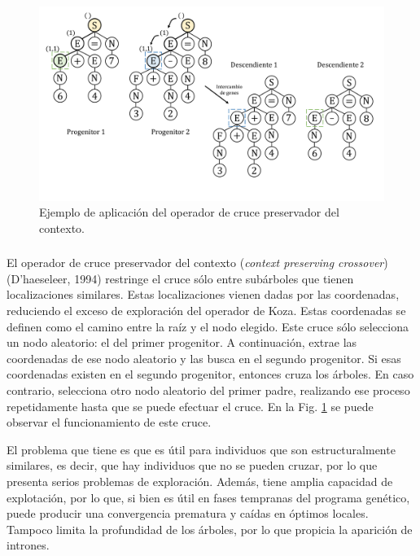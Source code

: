 \documentclass[spanish,a4paper,12pt,twoside]{report}
\begin{document}
        \begin{figure}[H]
          \centering
          \includegraphics[width = 1\textwidth]{resources/Fig8.pdf}
          \caption{Ejemplo de aplicación del operador de cruce preservador del contexto.}
          \label{fig:8}
        \end{figure} \par \vfill
      
        \subsubsection*{\vspace{-0.5cm}{\normalsize Operador de cruce preservador del contexto}}
        \vspace{-0.5cm}
        El operador de cruce preservador del contexto (\emph{context preserving crossover}) (D'haeseleer, 1994) restringe el cruce sólo entre subárboles que tienen localizaciones similares. Estas localizaciones vienen dadas por las coordenadas, reduciendo el exceso de exploración del operador de Koza. Estas coordenadas se definen como el camino entre la raíz y el nodo elegido. Este cruce sólo selecciona un nodo aleatorio: el del primer progenitor. A continuación, extrae las coordenadas de ese nodo aleatorio y las busca en el segundo progenitor. Si esas coordenadas existen en el segundo progenitor, entonces cruza los árboles. En caso contrario, selecciona otro nodo aleatorio del primer padre, realizando ese proceso repetidamente hasta que se puede efectuar el cruce. En la Fig. \ref{fig:8} se puede observar el funcionamiento de este cruce. \par
        El problema que tiene es que es útil para individuos que son estructuralmente similares, es decir, que hay individuos que no se pueden cruzar, por lo que presenta serios problemas de exploración. Además, tiene amplia capacidad de explotación, por lo que, si bien es útil en fases tempranas del programa genético, puede producir una convergencia prematura y caídas en óptimos locales. Tampoco limita la profundidad de los árboles, por lo que propicia la aparición de intrones.
        
\end{document}
